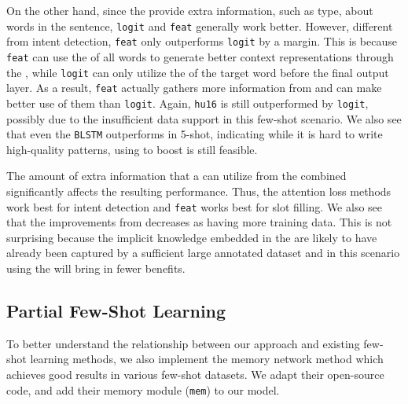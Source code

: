 On the other hand, since the \REtags provide extra information, such as type, about words in the sentence, \texttt{logit} and \texttt{feat}
generally work better. However, different from intent detection, \texttt{feat} only outperforms \texttt{logit} by a margin. This is because
\texttt{feat} can use the \REtags of all words to generate better context representations through the \NN, while \texttt{logit} can only
utilize the \REtag of the target word before the final output layer. As a result, \texttt{feat} actually gathers more information from \REs
and can make better use of them than \texttt{logit}. Again, \texttt{hu16} is still outperformed by \texttt{logit}, possibly due to the
insufficient data support in this few-shot scenario. We also see that even the \texttt{BLSTM} outperforms \REO in 5-shot, indicating while
it is hard to write high-quality \RE patterns, using \REs to boost \NNs is still feasible.


 The amount of extra information that a \NN can utilize from the combined \REs significantly affects the resulting
performance. Thus, the attention loss methods work best for intent detection and \texttt{feat} works best for slot filling. We also see
that the improvements from \REs decreases as having more training data. This is not surprising because the implicit knowledge embedded in
the \REs are likely to have already been captured by a sufficient large annotated dataset and in this scenario using the \REs will bring in
fewer benefits.

\subsection{Partial Few-Shot Learning}
To better understand the relationship between our approach and existing few-shot learning methods, we also implement the memory network
method \cite{kaiser2017learning} which achieves good results in various few-shot datasets. We adapt their open-source code, and add their
memory module (\texttt{mem}) to our \BLSTM model.

